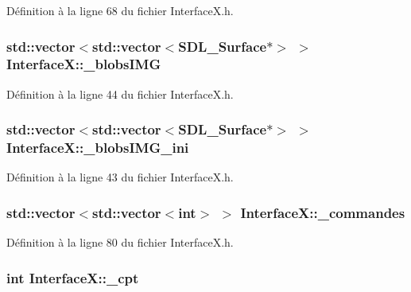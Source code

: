 Définition à la ligne 68 du fichier InterfaceX.h.

\hypertarget{a00011_aa47d2f27a33563cbadfdd7c98ff729f9}{
\subsubsection[{\_\-blobsIMG}]{\setlength{\rightskip}{0pt plus 5cm}std::vector$<$std::vector$<$SDL\_\-Surface$\ast$$>$ $>$ {\bf InterfaceX::\_\-blobsIMG}}}
\label{a00011_aa47d2f27a33563cbadfdd7c98ff729f9}


Définition à la ligne 44 du fichier InterfaceX.h.

\hypertarget{a00011_a4d99a064e76835578ea5363a76d13ade}{
\subsubsection[{\_\-blobsIMG\_\-ini}]{\setlength{\rightskip}{0pt plus 5cm}std::vector$<$std::vector$<$SDL\_\-Surface$\ast$$>$ $>$ {\bf InterfaceX::\_\-blobsIMG\_\-ini}}}
\label{a00011_a4d99a064e76835578ea5363a76d13ade}


Définition à la ligne 43 du fichier InterfaceX.h.

\hypertarget{a00011_a15a5fd30d586b8998a6275a372836679}{
\subsubsection[{\_\-commandes}]{\setlength{\rightskip}{0pt plus 5cm}std::vector$<$std::vector$<$int$>$ $>$ {\bf InterfaceX::\_\-commandes}}}
\label{a00011_a15a5fd30d586b8998a6275a372836679}


Définition à la ligne 80 du fichier InterfaceX.h.

\hypertarget{a00011_af85d5f48a87755c72b61a986471cfebf}{
\subsubsection[{\_\-cpt}]{\setlength{\rightskip}{0pt plus 5cm}int {\bf InterfaceX::\_\-cpt}}}
\label{a00011_af85d5f48a87755c72b61a986471cfebf}


